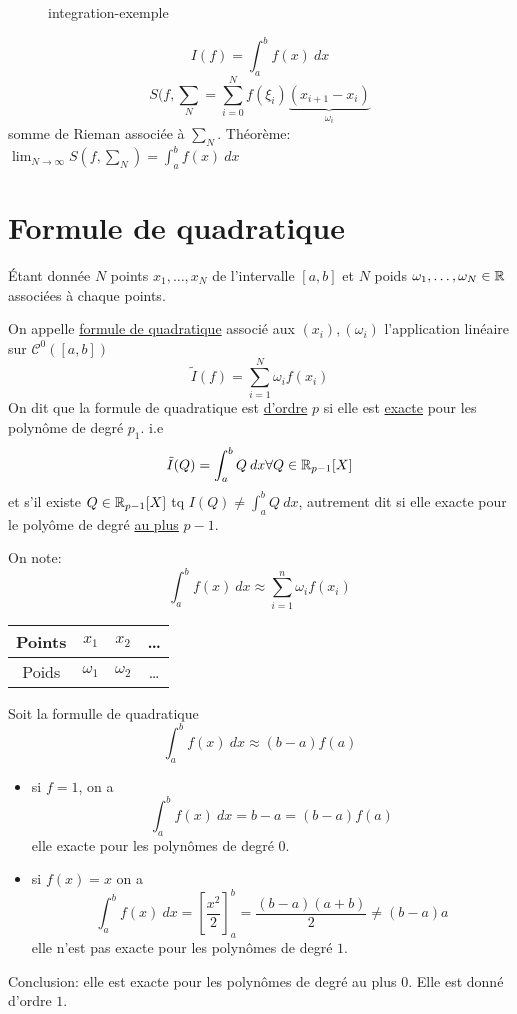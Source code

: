 \documentclass[a4paper]{report}
\begin{document}
\begin{figure}[H]
    \centering
    \caption{integration-exemple}
    \label{fig:integration-exemple}
\end{figure}

\[
I(f) = \int_{{a}}^{{b}} {f(x)} \: d{x} {}
\] 
\[
    S(f, \sum_{N} = \sum_{i=0}^{N} f(\xi_i)\underbrace{(x_{i+1} - x_{i})}_{\omega_i}
\] 
somme de Rieman associée à $\sum_{N}$. Théorème: $\lim_{N \to \infty} S(f, \sum_{N}) = \int_{{a}}^{{b}} {f(x)} \: d{x} {}$

\section{Formule de quadratique}
\begin{definition}
    Étant donnée $N$ points  $x_1, \ldots, x_N$ de l'intervalle $[a, b]$  et $N$ poids  $\omega_1, \ldots, \omega_N \in \mathbb{R}$ associées à chaque points.
    \par
    On appelle \underline{formule de quadratique} associé aux $(x_i),(\omega_i)$ l'application linéaire sur  $\mathcal{C}^0([a, b])$
     \[
         \tilde{I}(f) = \sum_{i=1}^{N} \omega_i f(x_i)
    \] 
    On dit que la formule de quadratique est \underline{d'ordre} $p$ si elle est \underline{exacte} pour les polynôme de degré  $p_1$. i.e
     \[
         \tilde{I}(Q) = \int_{{a}}^{{b}} {Q} \: d{x} {} \forall Q \in \mathbb{R}_{p-1}[X]
    \] 
    et s'il existe $Q \in \mathbb{R}_{p-1}[X]$ tq $I(Q) \neq \int_{{a}}^{{b}} {Q} \: d{x}$, autrement dit si elle exacte pour le polyôme de degré \underline{au plus} $p-1$.
\end{definition}
\begin{remark}
   On note:
   \[
   \int_{{a}}^{{b}} {f(x)} \: d{x} \approx \sum_{i=1}^{n} \omega_i f(x_i)
   \] 
   \begin{center}
    \begin{tabular}{| c | c | c | c |}
        \hline
        Points & $x_1$ &  $x_2$ &  \ldots \\  
        \hline
        Poids & $\omega_1$ &  $\omega_2$ &  \ldots \\
        \hline
    \end{tabular}
\end{center}
\end{remark}
\begin{eg}
   Soit la formulle de quadratique 
   \[
   \int_{{a}}^{{b}} {f(x)} \: d{x} \approx (b-a)f(a)
   \] 
   \begin{itemize}
       \item si $f = 1$, on a  
           \[
               \int_{{a}}^{{b}} {f(x)} \: d{x} {} = b - a = (b-a)f(a)
           \] 
           elle exacte pour les polynômes de degré 0.
        \item si $f(x) = x$ on a
             \[
                 \int_{{a}}^{{b}} {f(x)} \: d{x} = \left[ \frac{x^2}{2} \right]_{a}^{b}  = \frac{(b-a)(a+b)}{2} \neq (b-a)a
            \] 
            elle n'est pas exacte pour les polynômes de degré $1$.
   \end{itemize}
   Conclusion: elle est exacte pour les polynômes de degré au plus 0. Elle est donné d'ordre $1$.
\end{eg}
\end{document}
